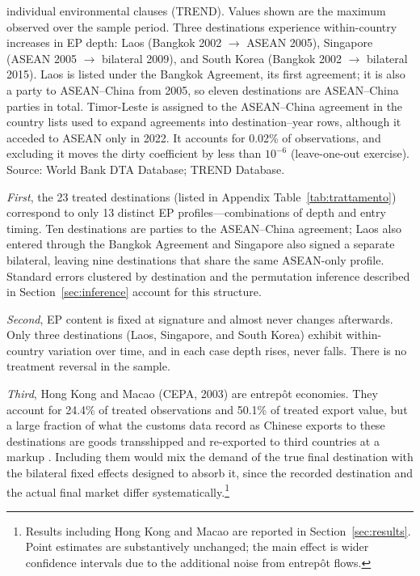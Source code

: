 \documentclass[12pt]{article}
\begin{document}
\begin{table}[htbp]
\begin{threeparttable}
\begin{tablenotes}
individual environmental clauses (TREND). Values shown are the maximum observed over
the sample period. Three destinations experience within-country increases in EP depth:
Laos (Bangkok 2002 $\to$ ASEAN 2005), Singapore (ASEAN 2005 $\to$ bilateral 2009), and
South Korea (Bangkok 2002 $\to$ bilateral 2015). Laos is listed under the Bangkok Agreement, its first agreement; it is also a party to ASEAN--China from 2005, so eleven destinations are ASEAN--China parties in total. Timor-Leste is assigned to the ASEAN--China agreement in the country lists used to expand agreements into destination--year rows, although it acceded to ASEAN only in 2022. It accounts for 0.02\% of observations, and excluding it moves the dirty coefficient by less than $10^{-6}$ (leave-one-out exercise). Source: World Bank DTA Database; TREND Database.
\end{tablenotes}
\end{threeparttable}
\end{table}

\emph{First}, the 23 treated destinations (listed in Appendix Table~\ref{tab:trattamento}) correspond to only 13 distinct EP profiles---combinations of depth and entry timing. Ten destinations are parties to the ASEAN--China agreement; Laos also entered through the Bangkok Agreement and Singapore also signed a separate bilateral, leaving nine destinations that share the same ASEAN-only profile. Standard errors clustered by destination and the permutation inference described in Section~\ref{sec:inference} account for this structure.

\emph{Second}, EP content is fixed at signature and almost never changes afterwards. Only
three destinations (Laos, Singapore, and South Korea) exhibit within-country variation
over time, and in each case depth rises, never falls. There is no treatment reversal
in the sample.

\emph{Third}, Hong Kong and Macao (CEPA, 2003) are entrepôt economies. They account for
24.4\% of treated observations and 50.1\% of treated export value, but a large fraction
of what the customs data record as Chinese exports to these destinations are goods
transshipped and re-exported to third countries at a markup \citep{feenstra2004}.
Including them would mix the demand of the true final destination with the bilateral
fixed effects designed to absorb it, since the recorded destination and the actual
final market differ systematically.\footnote{Results including Hong Kong and Macao are
reported in Section~\ref{sec:results}. Point estimates are substantively unchanged; the
main effect is wider confidence intervals due to the additional noise from entrepôt
flows.}
\end{document}
